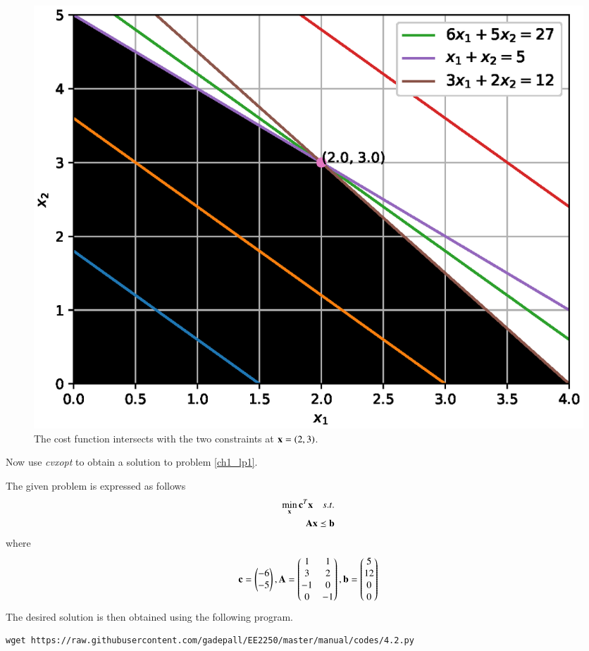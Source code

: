 \documentclass[journal,12pt,twocolumn]{IEEEtran}
\begin{document}
%
\begin{figure}[h]
\centering
\includegraphics[width=\columnwidth]{./figs/4.1.eps}
\caption{ The cost function intersects with the two constraints at $\mathbf{x} = \left(2,3\right)$. }
\label{fig.4.1}	
\end{figure}
%
\begin{problem}
	Now use {\em cvxopt} to obtain a solution to problem \ref{ch1_lp1}.
\end{problem}
\solution
The given problem is expressed as follows
%
\begin{align}
\min_{\mathbf{x}}	\mathbf{c}^{T}\mathbf{x}\quad s.t.
\\
\mathbf{A}\mathbf{x} \preceq \mathbf{b}
\end{align}
%
where
%
\begin{equation}
\mathbf{c}
=
\begin{pmatrix}
-6
\\
-5
\end{pmatrix},
\mathbf{A} = 
\begin{pmatrix}
1 & 1
\\
3 & 2
\\
-1 & 0
\\
0 & -1
\end{pmatrix},
\mathbf{b}
= 
\begin{pmatrix}
5
\\
12
\\
0
\\
0 
\end{pmatrix}
\end{equation}
%	
The desired solution is then obtained using the following program.
\begin{lstlisting}
wget https://raw.githubusercontent.com/gadepall/EE2250/master/manual/codes/4.2.py
\end{lstlisting}
\end{document}
